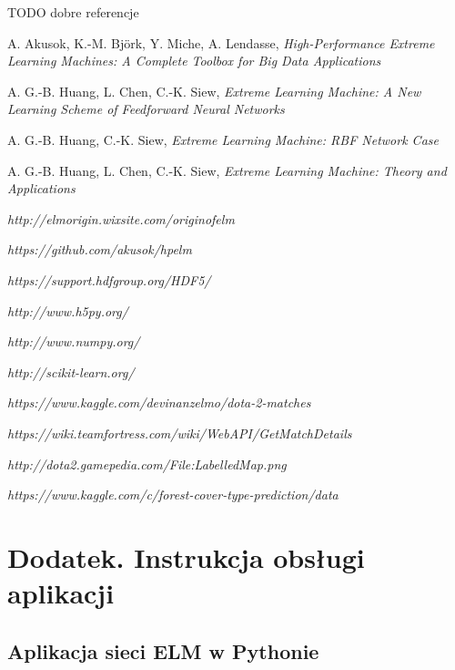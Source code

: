 \documentclass{article}
\begin{document}
TODO dobre referencje
\begin{thebibliography}{9}
  A. Akusok, K.-M. Björk, Y. Miche, A. Lendasse,
  \emph{High-Performance Extreme Learning Machines: A Complete Toolbox for Big Data Applications}


  A. G.-B. Huang, L. Chen, C.-K. Siew, 
  \emph{Extreme Learning Machine: A New Learning Scheme of Feedforward Neural Networks}
  
  A. G.-B. Huang, C.-K. Siew, 
  \emph{Extreme Learning Machine: RBF Network Case} 

  A. G.-B. Huang, L. Chen, C.-K. Siew, 
  \emph{Extreme Learning Machine: Theory and Applications} 
  
  \emph{http://elmorigin.wixsite.com/originofelm}  
  
  \emph{https://github.com/akusok/hpelm}  
  
  \emph{https://support.hdfgroup.org/HDF5/}  
  
  \emph{http://www.h5py.org/}
  
  \emph{http://www.numpy.org/}  
  
  \emph{http://scikit-learn.org/}  

  \emph{https://www.kaggle.com/devinanzelmo/dota-2-matches}
  
  \emph{https://wiki.teamfortress.com/wiki/WebAPI/GetMatchDetails}
  
  \emph{http://dota2.gamepedia.com/File:Labelled\textunderscore Map.png}

  \emph{https://www.kaggle.com/c/forest-cover-type-prediction/data}
  
\end{thebibliography}

\clearpage
{}
\listoffigures
\clearpage
{}
\listoftables
\clearpage
\section*{Dodatek. Instrukcja obsługi aplikacji}
\subsection*{Aplikacja sieci ELM w Pythonie}
\end{document}
